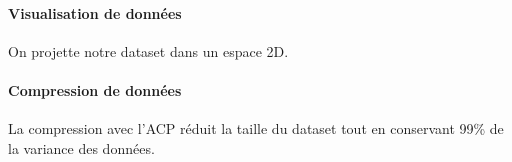 \newpage
\paragraph{Visualisation de données\\}
On projette notre dataset dans un espace 2D.

\begin{figure}[H]
    \centering
    \qquad
\end{figure}

\paragraph{Compression de données \\}

La compression avec l’ACP réduit la taille du dataset tout en conservant 99\% de la variance des données.

